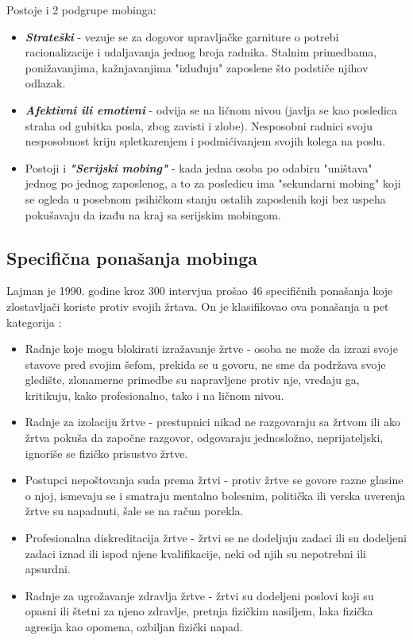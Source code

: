 \documentclass[a4paper]{article}
\newcommand{\quotes}[1]{"#1"}
\begin{document}
        Postoje i 2 podgrupe mobinga:
        \begin{itemize}
            \item \textbf{\textit{Strateški}} - vezuje se za dogovor upravljačke garniture o potrebi racionalizacije i udaljavanja jednog broja radnika. Stalnim primedbama, ponižavanjima, kažnjavanjima \quotes{izluđuju} zaposlene što podstiče njihov odlazak.
            \item \textbf{\textit{Afektivni ili emotivni}} - odvija se na ličnom nivou (javlja se kao posledica straha od gubitka posla, zbog zavisti i zlobe). Nesposobni radnici svoju nesposobnost kriju spletkarenjem i podmićivanjem svojih kolega na poslu.
            \item Postoji i \textbf{\textit{\quotes{Serijski mobing}}} - kada jedna osoba po odabiru \quotes{uništava} jednog po jednog zaposlenog, a to za posledicu ima \quotes{sekundarni mobing} koji se ogleda u posebnom psihičkom stanju ostalih zaposlenih koji bez uspeha pokušavaju da izađu na kraj sa serijskim mobingom.
        \end{itemize}
        
    \subsection{Specifična ponašanja mobinga}
        Lajman je 1990. godine kroz 300 intervjua prošao 46 specifičnih ponašanja koje zlostavljači koriste protiv svojih žrtava. On je klasifikovao ova ponašanja u pet kategorija \cite{CORNOIU2013708}:
        \begin{itemize}
            \item Radnje koje mogu blokirati izražavanje žrtve - osoba ne može da izrazi svoje stavove pred svojim šefom, prekida se u govoru, ne sme da podržava svoje gledište, zlonamerne primedbe su napravljene protiv nje, vređaju ga, kritikuju, kako profesionalno, tako i na ličnom nivou.
            \item Radnje za izolaciju žrtve - prestupnici nikad ne razgovaraju sa žrtvom ili ako žrtva pokuša da započne razgovor, odgovaraju jednosložno, neprijateljski, ignoriše se fizičko prisustvo žrtve.
            \item Postupci nepoštovanja suda prema žrtvi - protiv žrtve se govore razne glasine o njoj, ismevaju se i smatraju mentalno bolesnim, politička ili verska uverenja žrtve su napadnuti, šale se na račun porekla.
            \item Profesionalna diskreditacija žrtve - žrtvi se ne dodeljuju zadaci ili su dodeljeni zadaci iznad ili ispod njene kvalifikacije, neki od njih su nepotrebni ili apsurdni.
            \item Radnje za ugrožavanje zdravlja žrtve - žrtvi su dodeljeni poslovi koji su opasni ili štetni za njeno zdravlje, pretnja fizičkim nasiljem, laka fizička agresija kao opomena, ozbiljan fizički napad.
        \end{itemize}
        
\end{document}
